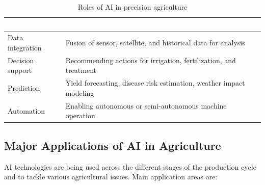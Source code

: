 \begin{table}[H]
\centering
\caption{Roles of AI in precision agriculture}
\label{tab:ai_roles_precision}
\small
\setlength{\extrarowheight}{5pt} %

\begin{tabularx}{\textwidth}{l X}
\toprule
\rowcolor[HTML]{2C3E50} %
\textcolor{white}{\textbf{Role}} & \textcolor{white}{\textbf{Description}} \\
\midrule

Data integration & Fusion of sensor, satellite, and historical data for analysis \\

\rowcolor[HTML]{F2F4F4} %
Decision support & Recommending actions for irrigation, fertilization, and treatment \\

Prediction       & Yield forecasting, disease risk estimation, weather impact modeling \\

\rowcolor[HTML]{F2F4F4} %
Automation       & Enabling autonomous or semi-autonomous machine operation \\
\bottomrule
\end{tabularx}
\end{table}

\subsection{Major Applications of AI in Agriculture}

AI technologies are being used across the different stages of the production cycle and to tackle various agricultural issues. Main application areas are:

